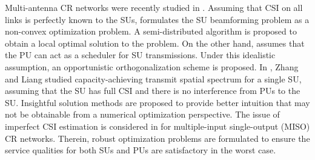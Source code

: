 \documentclass[twocolumn,10pt]{IEEEtran}
\theoremstyle{plain} \newtheorem{theorem}{Theorem}
\theoremstyle{plain} \newtheorem{proposition}{Proposition}
\theoremstyle{plain} \newtheorem{corollary}{Corollary}
\theoremstyle{remark} \newtheorem{remark}{Remark}
\theoremstyle{remark} \newtheorem{lemma}{Lemma}
\theoremstyle{plain} \newtheorem{definition}{Definition}
\theoremstyle{plain} \newtheorem{assumption}{Assumption}
\theoremstyle{plain} \newtheorem{fact}{Fact}
\begin{document}
Multi-antenna CR networks were recently studied in \cite{KG08,ZL08,SF09}.
Assuming that CSI on all links is perfectly known to the SUs,  \cite{KG08} formulates the SU beamforming problem as a non-convex optimization problem. A semi-distributed algorithm is proposed to obtain a local optimal solution to the problem. On the other hand, \cite{SF09} assumes that the PU can act as a scheduler for SU transmissions. Under this idealistic assumption, an opportunistic orthogonalization scheme is proposed. In \cite{ZL08}, Zhang and Liang studied capacity-achieving transmit spatial spectrum for a single SU, assuming that the SU has full CSI and there is no interference from PUs to the SU. Insightful solution methods are proposed to provide better intuition that may not be obtainable from a numerical optimization perspective. The issue of imperfect CSI estimation is considered in \cite{ZLC08, GLM09, PVS+09} for multiple-input single-output (MISO) CR networks. Therein, robust optimization problems are formulated to ensure the service qualities for both SUs and PUs are satisfactory in the worst case.
\end{document}
